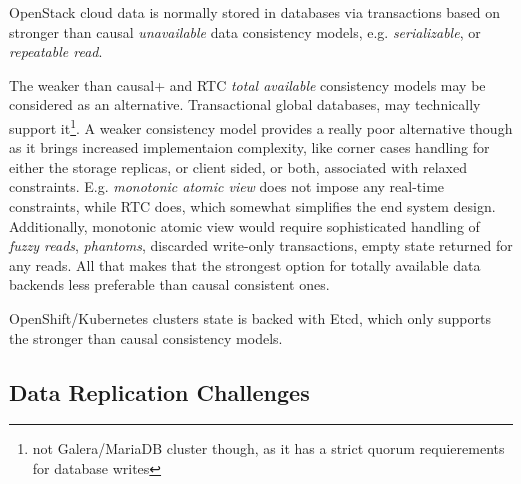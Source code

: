 \documentclass[conference]{IEEEtran}
\begin{document}
OpenStack cloud data is normally stored in databases via
transactions based on stronger than causal \textit{unavailable}\cite{b4} data
consistency models, e.g.  \textit{serializable}\cite{b4}, or \textit{repeatable
read}\cite{b4}.

The weaker than causal+ and RTC \textit{total available}\cite{b4}
consistency models may be considered as an alternative. Transactional global
databases\cite{b5}, may technically support it\footnote{not Galera/MariaDB
cluster though, as it has a strict quorum requierements for database writes}. A
weaker consistency model provides a really poor alternative though as it brings
increased implementaion complexity, like corner cases handling for either the
storage replicas, or client sided, or both, associated with relaxed
constraints. E.g. \textit{monotonic atomic view}\cite{b4} does not impose any
real-time constraints, while RTC does, which somewhat simplifies
the end system design. Additionally, monotonic atomic view would require
sophisticated handling of \textit{fuzzy reads}\cite{b4},
\textit{phantoms}\cite{b4}, discarded write-only transactions, empty state
returned for any reads. All that makes that the strongest option for totally
available data backends less preferable than causal consistent ones.

OpenShift/Kubernetes clusters state is backed with Etcd, which only supports
the stronger than causal consistency models.

\subsection{Data Replication Challenges}
\end{document}
